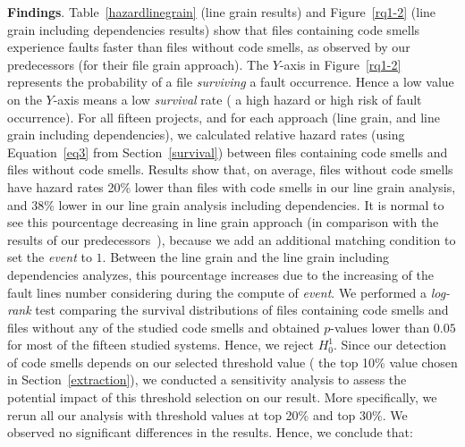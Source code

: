 \textbf{Findings}. {\color{blue}Table~\ref{hazardlinegrain} (line grain results) and Figure~\ref{rq1-2} (line grain including dependencies results) show that files containing code smells experience faults faster than files without code smells, as observed by our predecessors (for their file grain approach).} The $Y$-axis in {\color{blue}Figure~\ref{rq1-2}} represents the probability of a file \emph{surviving} a fault occurrence. Hence a low value on the $Y$-axis means a low \emph{survival} rate (\ie{} a high hazard or high risk of fault occurrence).  
For all {\color{blue}fifteen} projects, {\color{blue}and for each approach (line grain, and line grain including dependencies),} we calculated relative hazard rates (using Equation~\ref{eq3} from Section~\ref{survival}) between files containing code smells and files without code smells. Results show that, on average, files without code smells have hazard rates {\color{blue}20\% lower than files with code smells in our line grain analysis, and 38\% lower in our line grain analysis including dependencies. It is normal to see this pourcentage decreasing in line grain approach (in comparison with the results of our predecessors~\cite{saboury2017empirical}), because we add an additional matching condition to set the \emph{event} to $1$. Between the line grain and the line grain including dependencies analyzes, this pourcentage increases due to the increasing of the fault lines number considering during the compute of \emph{event}.} We performed a \textsl{log-rank} test comparing the survival distributions of files containing code smells and files without any of the studied code smells and obtained $p$-values lower than $0.05$ for {\color{blue}most of the fifteen} studied systems. Hence, we reject $H^{1}_{0}$.
Since our detection of code smells depends on our selected threshold value (\ie{} the top 10\% value chosen in Section~\ref{extraction}), we conducted a sensitivity analysis to assess the potential impact of this threshold selection on our result. More specifically, we rerun all our analysis with threshold values at top 20\% and top 30\%. We observed no significant differences in the results. Hence, we conclude that:


